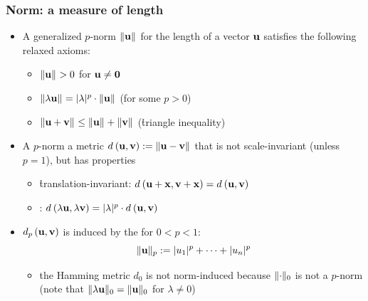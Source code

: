 \documentclass[t]{beamer} %
\begin{document}
\begin{frame}
  \frametitle{Norm: a measure of length}

  \begin{itemize}
  \item A generalized \h{$p$-norm} $\norm{\vu}$ for the length of a vector $\vu$ 
    satisfies the following relaxed axioms:
    \begin{itemize}
    \item $\norm{\vu} > 0$ for $\vu \neq \vnull$
    \item $\norm{\lambda\vu} = \abs{\lambda}^p \cdot \norm{\vu}$ (for some $p > 0$)
    \item $\norm{\vu + \vv} \leq \norm{\vu} + \norm{\vv}$
      (\h{triangle inequality})
    \end{itemize}
  \item A $p$-norm  a metric
    \( 
    \dist{\vu}{\vv} \coloneq \norm{\vu - \vv} 
    \)
    that is not scale-invariant (unless $p = 1$), but has properties
    \begin{itemize}
    \item \h{translation-invariant}: $\dist{\vu+\vx}{\vv+\vx} = \dist{\vu}{\vv}$
    \item {}: $\dist{\lambda\vu}{\lambda\vv} = \abs{\lambda}^p\cdot \dist{\vu}{\vv}$
    \end{itemize}
  \item $\dist[p]{\vu}{\vv}$ is induced by the  for $0 < p < 1$:
    \[
      \norm[p]{\vu} \coloneq \abs{u_1}^p + \dots + \abs{u_n}^p
    \]
    \begin{itemize}\ungap[1]
    \item[\hand] the Hamming metric $d_0$ is not norm-induced because $\norm[0]{\cdot}$ is not a $p$-norm (note that $\norm[0]{\lambda \vu} = \norm[0]{\vu}$ for $\lambda \neq 0$)
    \end{itemize}
  \end{itemize}
\end{frame}
\end{document}
